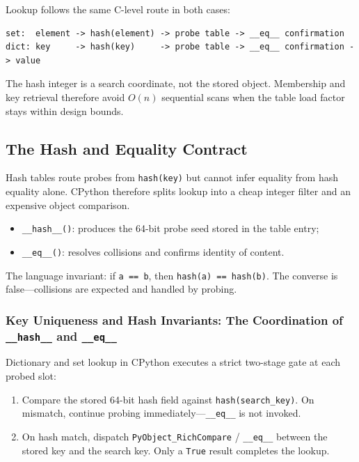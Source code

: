 \documentclass[a4paper,twoside]{report}
\begin{document}
Lookup follows the same C-level route in both cases:

\begin{verbatim}
set:  element -> hash(element) -> probe table -> __eq__ confirmation
dict: key     -> hash(key)     -> probe table -> __eq__ confirmation -> value
\end{verbatim}

The hash integer is a search coordinate, not the stored object. Membership and key retrieval therefore avoid $O(n)$ sequential scans when the table load factor stays within design bounds.


\subsection{The Hash and Equality Contract}

Hash tables route probes from \texttt{hash(key)} but cannot infer equality from hash equality alone. CPython therefore splits lookup into a cheap integer filter and an expensive object comparison.

\begin{itemize}
    \item \texttt{\_\_hash\_\_()}: produces the 64-bit probe seed stored in the table entry;
    \item \texttt{\_\_eq\_\_()}: resolves collisions and confirms identity of content.
\end{itemize}

The language invariant: if \texttt{a == b}, then \texttt{hash(a) == hash(b)}. The converse is false---collisions are expected and handled by probing.

\subsubsection{Key Uniqueness and Hash Invariants: The Coordination of \texttt{\_\_hash\_\_} and \texttt{\_\_eq\_\_}}

Dictionary and set lookup in CPython executes a strict two-stage gate at each probed slot:

\begin{enumerate}
    \item Compare the stored 64-bit hash field against \texttt{hash(search\_key)}. On mismatch, continue probing immediately---\texttt{\_\_eq\_\_} is not invoked.
    \item On hash match, dispatch \texttt{PyObject\_RichCompare} / \texttt{\_\_eq\_\_} between the stored key and the search key. Only a \texttt{True} result completes the lookup.
\end{enumerate}
\end{document}
